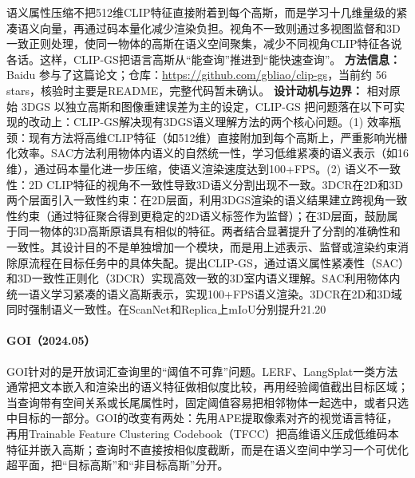 语义属性压缩不把512维CLIP特征直接附着到每个高斯，而是学习十几维量级的紧凑语义向量，再通过码本量化减少渲染负担。视角不一致则通过多视图监督和3D一致正则处理，使同一物体的高斯在语义空间聚集，减少不同视角CLIP特征各说各话。这样，CLIP-GS把语言高斯从“能查询”推进到“能快速查询”。
\textbf{方法信息：} Baidu 参与了这篇论文；仓库：\url{https://github.com/gbliao/clip-gs}，当前约 56 stars，核验时主要是README，完整代码暂未确认。
\textbf{设计动机与边界：} 相对原始 3DGS 以独立高斯和图像重建误差为主的设定，CLIP-GS 把问题落在以下可实现的改动上：CLIP-GS解决现有3DGS语义理解方法的两个核心问题。(1) 效率瓶颈：现有方法将高维CLIP特征（如512维）直接附加到每个高斯上，严重影响光栅化效率。SAC方法利用物体内语义的自然统一性，学习低维紧凑的语义表示（如16维），通过码本量化进一步压缩，使语义渲染速度达到100+FPS。(2) 语义不一致性：2D CLIP特征的视角不一致性导致3D语义分割出现不一致。3DCR在2D和3D两个层面引入一致性约束：在2D层面，利用3DGS渲染的语义结果建立跨视角一致性约束（通过特征聚合得到更稳定的2D语义标签作为监督）；在3D层面，鼓励属于同一物体的3D高斯原语具有相似的特征。两者结合显著提升了分割的准确性和一致性。其设计目的不是单独增加一个模块，而是用上述表示、监督或渲染约束消除原流程在目标任务中的具体失配。提出CLIP-GS，通过语义属性紧凑性（SAC）和3D一致性正则化（3DCR）实现高效一致的3D室内语义理解。SAC利用物体内统一语义学习紧凑的语义高斯表示，实现100+FPS语义渲染。3DCR在2D和3D域同时强制语义一致性。在ScanNet和Replica上mIoU分别提升21.20%
\paragraph{GOI（2024.05）\cite{2405_17596}}
GOI针对的是开放词汇查询里的“阈值不可靠”问题。LERF、LangSplat一类方法通常把文本嵌入和渲染出的语义特征做相似度比较，再用经验阈值截出目标区域；当查询带有空间关系或长尾属性时，固定阈值容易把相邻物体一起选中，或者只选中目标的一部分。GOI的改变有两处：先用APE提取像素对齐的视觉语言特征，再用Trainable Feature Clustering Codebook（TFCC）把高维语义压成低维码本特征并嵌入高斯；查询时不直接按相似度截断，而是在语义空间中学习一个可优化超平面，把“目标高斯”和“非目标高斯”分开。

